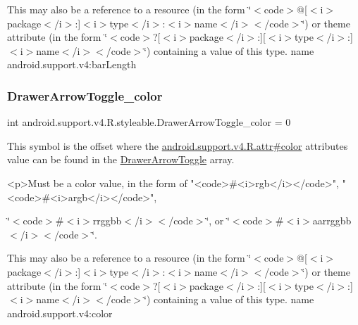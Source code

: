 This may also be a reference to a resource (in the form \char`\"{}$<$code$>$@\mbox{[}$<$i$>$package$<$/i$>$\+:\mbox{]}$<$i$>$type$<$/i$>$\+:$<$i$>$name$<$/i$>$$<$/code$>$\char`\"{}) or theme attribute (in the form \char`\"{}$<$code$>$?\mbox{[}$<$i$>$package$<$/i$>$\+:\mbox{]}\mbox{[}$<$i$>$type$<$/i$>$\+:\mbox{]}$<$i$>$name$<$/i$>$$<$/code$>$\char`\"{}) containing a value of this type.  name android.\+support.\+v4\+:bar\+Length \mbox{\label{classandroid_1_1support_1_1v4_1_1R_1_1styleable_ace7c2b30ab349131726e0b7a4ea67103}} 
\subsubsection{\texorpdfstring{Drawer\+Arrow\+Toggle\+\_\+color}{DrawerArrowToggle\_color}}
{\footnotesize\ttfamily int android.\+support.\+v4.\+R.\+styleable.\+Drawer\+Arrow\+Toggle\+\_\+color = 0\hspace{0.3cm}{\ttfamily [static]}}

This symbol is the offset where the \hyperlink{classandroid_1_1support_1_1v4_1_1R_1_1attr_ae88bfab69b7797740137d224e6656578}{android.\+support.\+v4.\+R.\+attr\#color} attribute\textquotesingle{}s value can be found in the \hyperlink{classandroid_1_1support_1_1v4_1_1R_1_1styleable_af08d693b5d7faf0f18822ffe29c6028c}{Drawer\+Arrow\+Toggle} array.

\begin{DoxyVerb}      <p>Must be a color value, in the form of "<code>#<i>rgb</i></code>", "<code>#<i>argb</i></code>",
\end{DoxyVerb}
 \char`\"{}$<$code$>$\#$<$i$>$rrggbb$<$/i$>$$<$/code$>$\char`\"{}, or \char`\"{}$<$code$>$\#$<$i$>$aarrggbb$<$/i$>$$<$/code$>$\char`\"{}. 

This may also be a reference to a resource (in the form \char`\"{}$<$code$>$@\mbox{[}$<$i$>$package$<$/i$>$\+:\mbox{]}$<$i$>$type$<$/i$>$\+:$<$i$>$name$<$/i$>$$<$/code$>$\char`\"{}) or theme attribute (in the form \char`\"{}$<$code$>$?\mbox{[}$<$i$>$package$<$/i$>$\+:\mbox{]}\mbox{[}$<$i$>$type$<$/i$>$\+:\mbox{]}$<$i$>$name$<$/i$>$$<$/code$>$\char`\"{}) containing a value of this type.  name android.\+support.\+v4\+:color \mbox{\label{classandroid_1_1support_1_1v4_1_1R_1_1styleable_a4c53abe96194151c3a62076cc72f6048}} 
